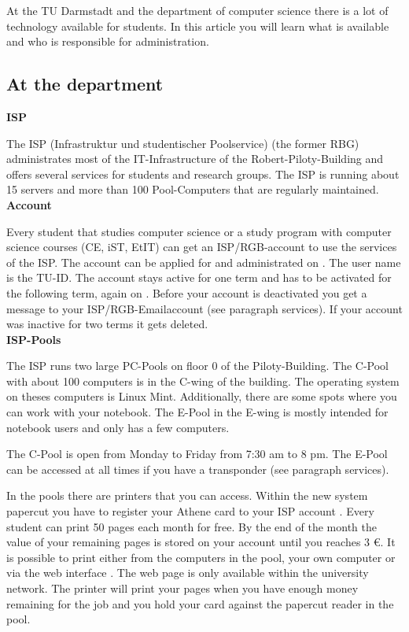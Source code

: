 {At the TU Darmstadt and the department of computer science there is a lot of technology available for students. In this article you will learn what is available and who is responsible for administration.
}{
\subsection*{At the department}

\noindent\textbf{ISP}

The ISP (Infrastruktur und studentischer Poolservice) \footnotemark[1] (the former RBG) administrates most of the IT-Infrastructure of the Robert-Piloty-Building and offers several services for students and research groups. The ISP is running about 15 servers and more than 100 Pool-Computers that are regularly maintained.\\

\noindent\textbf{Account}

Every student that studies computer science or a study program with computer science courses (CE, iST, EtIT) can get an ISP/RGB-account to use the services of the ISP. The account can be applied for and administrated on \footnotemark[2]. The user name is the TU-ID. The account stays active for one term and has to be activated for the following term, again on \footnotemark[2]. Before your account is deactivated you get a message to your ISP/RGB-Emailaccount (see paragraph services). If your account was inactive for two terms it gets deleted.\\

\noindent\textbf{ISP-Pools}

The ISP runs two large PC-Pools on floor 0 of the Piloty-Building. The C-Pool with about 100 computers is in the C-wing of the building. The operating system on theses computers is Linux Mint. Additionally, there are some spots where you can work with your notebook. The E-Pool in the E-wing is mostly intended for notebook users and only has a few computers.

The C-Pool is open from Monday to Friday from 7:30 am to 8 pm. The E-Pool can be accessed at all times if you have a transponder (see paragraph services).

In the pools there are printers that you can access.
Within the new system papercut you have to register your Athene card to your ISP account \footnotemark[3].
Every student can print 50 pages each month for free.
By the end of the month the value of your remaining pages is stored on your account until you reaches 3 \euro.
It is possible to print either from the computers in the pool, your own computer \footnotemark[3] or via the web interface \footnotemark[4].
The web page is only available within the university network.
The printer will print your pages when you have enough money remaining for the job and you hold your card against the papercut reader in the pool.

}
